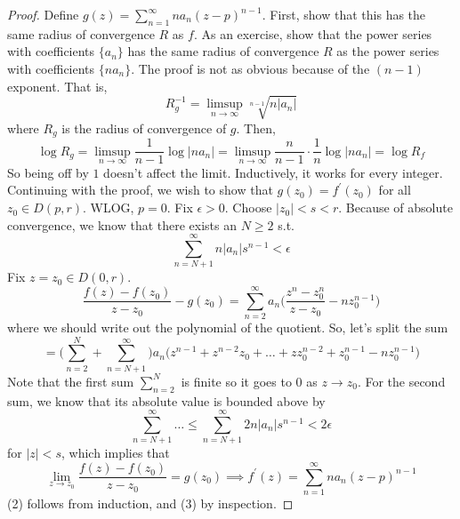 	\begin{proof}
		Define $g(z) = \sum_{n=1}^\infty n a_n (z - p)^{n-1}$. First, show that this has the same radius of convergence $R$ as $f$. As an exercise, show that the power series with coefficients $\{a_n\}$ has the same radius of convergence $R$ as the power series with coefficients $\{n a_n\}$. The proof is not as obvious because of the $(n-1)$ exponent. That is, 
		\begin{equation}
			R_g^{-1} = \limsup_{n \to \infty} \sqrt[n-1]{n |a_n|}
		\end{equation}
		where $R_g$ is the radius of convergence of $g$. Then, 
		\begin{equation}
			\log{R_g} = \limsup_{n \to \infty} \frac{1}{n-1} \log{|n a_n|} = \limsup_{n \to \infty} \frac{n}{n-1} \cdot \frac{1}{n} \log{|n a_n|} = \log{R_f}
		\end{equation}
		So being off by $1$ doesn't affect the limit. Inductively, it works for every integer. Continuing with the proof, we wish to show that $g(z_0) = f^\prime (z_0)$ for all $z_0 \in D(p, r)$. WLOG, $p = 0$. Fix $\epsilon > 0$. Choose $|z_0| < s < r$. Because of absolute convergence, we know that there exists an $N \geq 2$ s.t. 
		\begin{equation}
			\sum_{n = N+1}^\infty n |a_n| s^{n-1} < \epsilon
		\end{equation}
		Fix $z = z_0 \in D(0, r)$. 
		\begin{equation}
			\frac{f(z) - f(z_0)}{z - z_0} - g(z_0) = \sum_{n=2}^\infty a_n \bigg( \frac{z^n - z_0^n}{z - z_0} - n z_0^{n-1} \bigg)
		\end{equation}
		where we should write out the polynomial of the quotient. So, let's split the sum 
		\begin{equation}
			= \bigg( \sum_{n=2}^N + \sum_{n=N+1}^\infty \bigg) a_n \big( z^{n-1} + z^{n-2} z_0 + \ldots + z z_0^{n-2} + z_0^{n-1} - n z_0^{n-1} \big)
		\end{equation}
		Note that the first sum $\sum_{n=2}^N$ is finite so it goes to $0$ as $z \to z_0$. For the second sum, we know that its absolute value is bounded above by 
		\begin{equation}
			\sum_{n=N+1}^\infty \ldots \leq \sum_{n=N+1}^\infty 2n |a_n| s^{n-1} < 2 \epsilon
		\end{equation}
		for $|z| < s$, which implies that 
		\begin{equation}
			\lim_{z \to z_0} \frac{f(z) - f(z_0)}{z - z_0} = g(z_0) \implies f^\prime (z) = \sum_{n=1}^\infty n a_n (z - p)^{n-1} 
		\end{equation} 
		(2) follows from induction, and (3) by inspection. 
	\end{proof}

